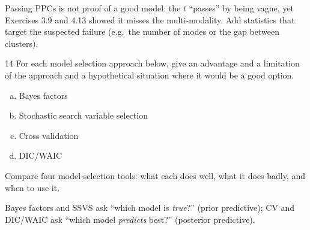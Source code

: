 \documentclass[11pt]{article}
\begin{document}
\begin{takeaway}
Passing PPCs is not proof of a good model: the $t$ ``passes'' by being vague, yet Exercises 3.9 and 4.13 showed it misses the multi-modality. Add statistics that target the suspected failure (e.g.\ the number of modes or the gap between clusters).
\end{takeaway}


\begin{problem}{14}
For each model selection approach below, give an advantage and a limitation of the approach and a hypothetical situation where it would be a good option.
\begin{enumerate}[(a)]
\item Bayes factors
\item Stochastic search variable selection
\item Cross validation
\item DIC/WAIC
\end{enumerate}
\end{problem}

\begin{restate}
Compare four model-selection tools: what each does well, what it does badly, and when to use it.
\end{restate}

\begin{keyidea}
Bayes factors and SSVS ask ``which model is \emph{true}?'' (prior predictive); CV and DIC/WAIC ask ``which model \emph{predicts} best?'' (posterior predictive).
\end{keyidea}
\end{document}
